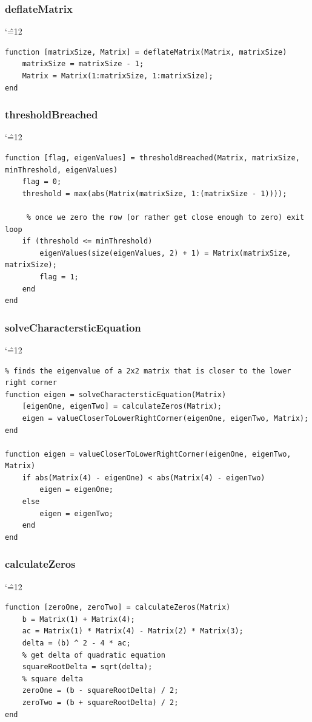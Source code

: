 \documentclass[12pt]{report}
\newenvironment{simplechar}{%
   \catcode`\^=12
}{}
\begin{document}
\subsubsection{deflateMatrix}
\begin{simplechar}
\begin{lstlisting}
function [matrixSize, Matrix] = deflateMatrix(Matrix, matrixSize)
    matrixSize = matrixSize - 1;
    Matrix = Matrix(1:matrixSize, 1:matrixSize);
end

\end{lstlisting}
\end{simplechar}

\newpage
\subsubsection{thresholdBreached}
\begin{simplechar}
\begin{lstlisting}
function [flag, eigenValues] = thresholdBreached(Matrix, matrixSize, minThreshold, eigenValues)
    flag = 0;
    threshold = max(abs(Matrix(matrixSize, 1:(matrixSize - 1))));

     % once we zero the row (or rather get close enough to zero) exit loop
    if (threshold <= minThreshold)
        eigenValues(size(eigenValues, 2) + 1) = Matrix(matrixSize, matrixSize);
        flag = 1;
    end
end
\end{lstlisting}
\end{simplechar}

\subsubsection{solveCharactersticEquation}
\begin{simplechar}
\begin{lstlisting}
% finds the eigenvalue of a 2x2 matrix that is closer to the lower right corner
function eigen = solveCharactersticEquation(Matrix)
    [eigenOne, eigenTwo] = calculateZeros(Matrix);
    eigen = valueCloserToLowerRightCorner(eigenOne, eigenTwo, Matrix);
end

function eigen = valueCloserToLowerRightCorner(eigenOne, eigenTwo, Matrix)
    if abs(Matrix(4) - eigenOne) < abs(Matrix(4) - eigenTwo)
        eigen = eigenOne;
    else
        eigen = eigenTwo;
    end
end
\end{lstlisting}
\end{simplechar}

\subsubsection{calculateZeros}
\begin{simplechar}
\begin{lstlisting}
function [zeroOne, zeroTwo] = calculateZeros(Matrix)
    b = Matrix(1) + Matrix(4);
    ac = Matrix(1) * Matrix(4) - Matrix(2) * Matrix(3);
    delta = (b) ^ 2 - 4 * ac;
    % get delta of quadratic equation
    squareRootDelta = sqrt(delta);
    % square delta
    zeroOne = (b - squareRootDelta) / 2;
    zeroTwo = (b + squareRootDelta) / 2;
end
\end{lstlisting}
\end{simplechar}
\end{document}
